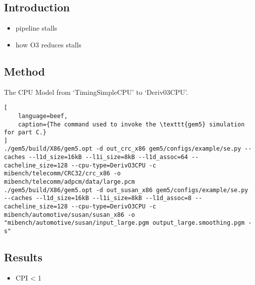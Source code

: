%
%



\subsection{Introduction}

\begin{itemize}
\item pipeline stalls
\item how O3 reduces stalls
\end{itemize}


\subsection{Method}

The CPU Model from `TimingSimpleCPU' to `Deriv03CPU'.

\begin{lstlisting}[
    language=beef,
    caption={The command used to invoke the \texttt{gem5} simulation for part C.}
]
./gem5/build/X86/gem5.opt -d out_crc_x86 gem5/configs/example/se.py --caches --l1d_size=16kB --l1i_size=8kB --l1d_assoc=64 --cacheline_size=128 --cpu-type=DerivO3CPU -c mibench/telecomm/CRC32/crc_x86 -o mibench/telecomm/adpcm/data/large.pcm
./gem5/build/X86/gem5.opt -d out_susan_x86 gem5/configs/example/se.py --caches --l1d_size=16kB --l1i_size=8kB --l1d_assoc=8 --cacheline_size=128 --cpu-type=DerivO3CPU -c mibench/automotive/susan/susan_x86 -o "mibench/automotive/susan/input_large.pgm output_large.smoothing.pgm -s"
\end{lstlisting}


\subsection{Results}

\begin{itemize}
\item CPI < 1
\end{itemize}


%    
